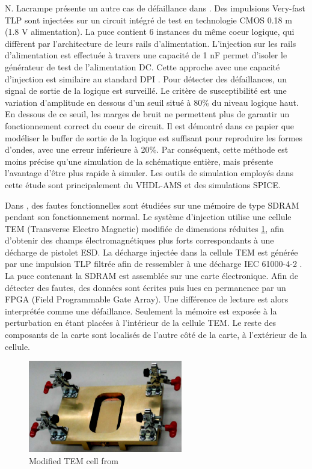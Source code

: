 N. Lacrampe présente un autre cas de défaillance dans \cite{LacrampeTransientImmunity}.
Des impulsions Very-fast TLP sont injectées sur un circuit intégré de test en technologie CMOS 0.18 \textmu{}m (1.8 V alimentation).
La puce contient 6 instances du même coeur logique, qui diffèrent par l'architecture de leurs rails d'alimentation.
L'injection sur les rails d'alimentation est effectuée à travers une capacité de 1 nF permet d'isoler le générateur de test de l'alimentation DC.
Cette approche avec une capacité d'injection est similaire au standard DPI \cite{iec62132-4}.
Pour détecter des défaillances, un signal de sortie de la logique est surveillé.
Le critère de susceptibilité est une variation d'amplitude en dessous d'un seuil situé à 80\% du niveau logique haut.
En dessous de ce seuil, les marges de bruit ne permettent plus de garantir un fonctionnement correct du coeur de circuit.
Il est démontré dans ce papier que modéliser le buffer de sortie de la logique est suffisant pour reproduire les formes d'ondes, avec une erreur inférieure à 20\%.
Par conséquent, cette méthode est moins précise qu'une simulation de la schématique entière, mais présente l'avantage d'être plus rapide à simuler.
Les outils de simulation employés dans cette étude sont principalement du VHDL-AMS et des simulations SPICE.

Dans \cite{SDRAMCase}, des fautes fonctionnelles sont étudiées sur une mémoire de type SDRAM pendant son fonctionnement normal.
Le système d'injection utilise une cellule TEM (Transverse Electro Magnetic) modifiée de dimensions réduites \ref{fig:modified-tem-cell}, afin d'obtenir des champs électromagnétiques plus forts correspondants à une décharge de pistolet ESD.
La décharge injectée dans la cellule TEM est générée par une impulsion TLP filtrée afin de ressembler à une décharge IEC 61000-4-2 \cite{iec61000-4-2}.
La puce contenant la SDRAM est assemblée sur une carte électronique.
Afin de détecter des fautes, des données sont écrites puis lues en permanence par un FPGA (Field Programmable Gate Array).
Une différence de lecture est alors interprétée comme une défaillance.
Seulement la mémoire est exposée à la perturbation en étant placées à l'intérieur de la cellule TEM.
Le reste des composants de la carte sont localisés de l'autre côté de la carte, à l'extérieur de la cellule.

\begin{figure}[!h]
  \centering
  \includegraphics[width=0.6\textwidth]{src/1/figures/modified_tem_cell.png}
  \caption{Modified TEM cell from \cite{SDRAMCase}}
  \label{fig:modified-tem-cell}
\end{figure}

